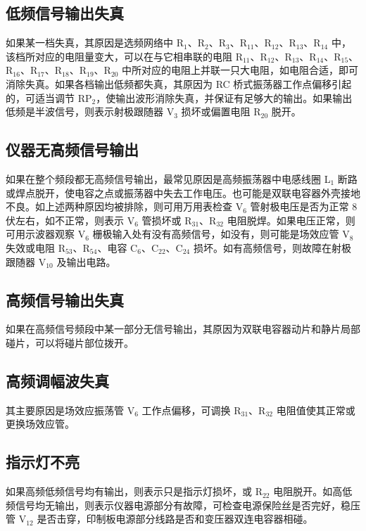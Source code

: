 \documentclass[12pt,UTF8]{ctexbook}
\begin{document}
	\subsection{低频信号输出失真}
	如果某一档失真，其原因是选频网络中 R\(_1\)、R\(_2\)、R\(_3\)、R\(_{11}\)、R\(_{12}\)、R\(_{13}\)、R\(_{14}\) 中，该档所对应的电阻量变大，可以在与它相串联的电阻 R\(_{11}\)、R\(_{12}\)、R\(_{13}\)、R\(_{14}\)、R\(_{15}\)、R\(_{16}\)、R\(_{17}\)、R\(_{18}\)、R\(_{19}\)、R\(_{20}\) 中所对应的电阻上并联一只大电阻，如电阻合适，即可消除失真。如果各档输出低频都失真，其原因为 RC 桥式振荡器工作点偏移引起的，可适当调节 RP\(_2\)，使输出波形消除失真，并保证有足够大的输出。如果输出低频是半波信号，则表示射极跟随器 V\(_3\) 损坏或偏置电阻 R\(_{20}\) 脱开。
	
	\subsection{仪器无高频信号输出}
	如果在整个频段都无高频信号输出，最常见原因是高频振荡器中电感线圈 L\(_1\) 断路或焊点脱开，使电容之点或振荡器中失去工作电压。也可能是双联电容器外壳接地不良。如上述两种原因均被排除，则可用万用表检查 V\(_6\) 管射极电压是否为正常 8 伏左右，如不正常，则表示 V\(_6\) 管损坏或 R\(_{31}\)、R\(_{32}\) 电阻脱焊。如果电压正常，则可用示波器观察 V\(_6\) 栅极输入处有没有高频信号，如没有，则可能是场效应管 V\(_8\) 失效或电阻 R\(_{53}\)、R\(_{54}\)、电容 C\(_6\)、C\(_{22}\)、C\(_{24}\) 损坏。如有高频信号，则故障在射极跟随器 V\(_{10}\) 及输出电路。
	
	\subsection{高频信号输出失真}
	如果在高频信号频段中某一部分无信号输出，其原因为双联电容器动片和静片局部碰片，可以将碰片部位拨开。
	
	\subsection{高频调幅波失真}
	其主要原因是场效应振荡管 V\(_6\) 工作点偏移，可调换 R\(_{31}\)、R\(_{32}\) 电阻值使其正常或更换场效应管。
	
	\subsection{指示灯不亮}
	如果高频低频信号均有输出，则表示只是指示灯损坏，或 R\(_{22}\) 电阻脱开。如高低频信号均无输出，则表示仪器电源部分有故障，可检查电源保险丝是否完好，稳压管 V\(_{12}\) 是否击穿，印制板电源部分线路是否和变压器双连电容器相碰。
	
\end{document}
